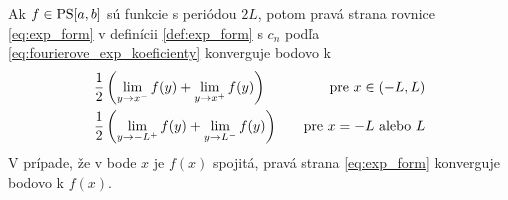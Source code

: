 \begin{veta}
    Ak $f \in \mbox{PS}[a,b]$ sú funkcie s periódou $2L$, potom 
    pravá strana rovnice 
    \ref{eq:exp_form} v definícii \ref{def:exp_form} s $c_n$ podľa 
    \ref{eq:fourierove_exp_koeficienty} konverguje
    bodovo k
    \begin{align*}
        &\frac{1}{2}\left( \lim_{y\rightarrow x^-} f(y) +
                \lim_{y\rightarrow x^+} f(y)\right) \quad &\mbox{pre\ }
                x\in(-L,L) \\
        &\frac{1}{2}\left( \lim_{y\rightarrow -L^+} f(y) +
                \lim_{y\rightarrow L^-} f(y)\right) \quad &\mbox{pre\ }
                x=-L \mbox{\ alebo\ } L            
    \end{align*}
    V prípade, že v bode $x$ je $f(x)$ spojitá, pravá strana \ref{eq:exp_form} 
    konverguje bodovo k $f(x)$.
\end{veta}
